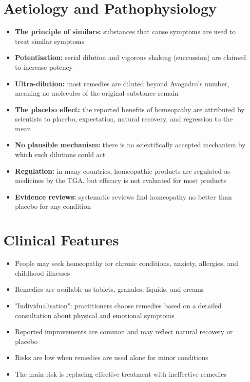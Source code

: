 \section*{Aetiology and Pathophysiology}
\begin{itemize}
    \item \textbf{The principle of similars:} substances that cause symptoms are used to treat similar symptoms
    \item \textbf{Potentisation:} serial dilution and vigorous shaking (succussion) are claimed to increase potency
    \item \textbf{Ultra-dilution:} most remedies are diluted beyond Avogadro's number, meaning no molecules of the original substance remain
    \item \textbf{The placebo effect:} the reported benefits of homeopathy are attributed by scientists to placebo, expectation, natural recovery, and regression to the mean
    \item \textbf{No plausible mechanism:} there is no scientifically accepted mechanism by which such dilutions could act
    \item \textbf{Regulation:} in many countries, homeopathic products are regulated as medicines by the TGA, but efficacy is not evaluated for most products
    \item \textbf{Evidence reviews:} systematic reviews find homeopathy no better than placebo for any condition
\end{itemize}

\section*{Clinical Features}
\begin{itemize}
    \item People may seek homeopathy for chronic conditions, anxiety, allergies, and childhood illnesses
    \item Remedies are available as tablets, granules, liquids, and creams
    \item "Individualisation": practitioners choose remedies based on a detailed consultation about physical and emotional symptoms
    \item Reported improvements are common and may reflect natural recovery or placebo
    \item Risks are low when remedies are used alone for minor conditions
    \item The main risk is replacing effective treatment with ineffective remedies
\end{itemize}

